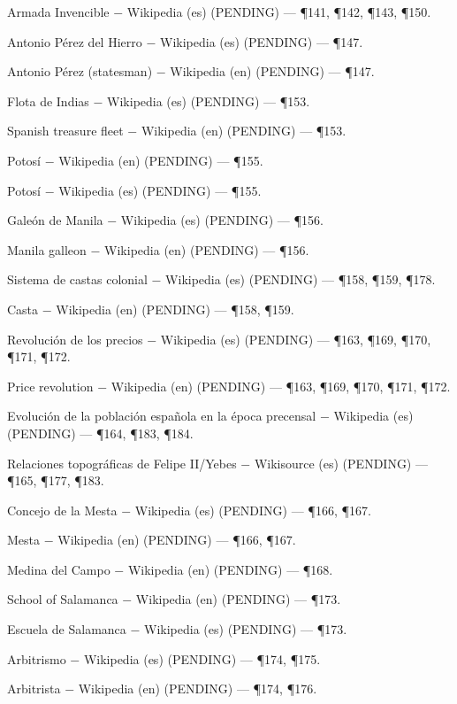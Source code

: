 \documentclass{book}
\begin{document}
\noindent Armada Invencible \(-\) Wikipedia (es) (PENDING) --- \P141, \P142, \P143, \P150.

\noindent Antonio Pérez del Hierro \(-\) Wikipedia (es) (PENDING) --- \P147.

\noindent Antonio Pérez (statesman) \(-\) Wikipedia (en) (PENDING) --- \P147.

\noindent Flota de Indias \(-\) Wikipedia (es) (PENDING) --- \P153.

\noindent Spanish treasure fleet \(-\) Wikipedia (en) (PENDING) --- \P153.

\noindent Potosí \(-\) Wikipedia (en) (PENDING) --- \P155.

\noindent Potosí \(-\) Wikipedia (es) (PENDING) --- \P155.

\noindent Galeón de Manila \(-\) Wikipedia (es) (PENDING) --- \P156.

\noindent Manila galleon \(-\) Wikipedia (en) (PENDING) --- \P156.

\noindent Sistema de castas colonial \(-\) Wikipedia (es) (PENDING) --- \P158, \P159, \P178.

\noindent Casta \(-\) Wikipedia (en) (PENDING) --- \P158, \P159.

\noindent Revolución de los precios \(-\) Wikipedia (es) (PENDING) --- \P163, \P169, \P170, \P171, \P172.

\noindent Price revolution \(-\) Wikipedia (en) (PENDING) --- \P163, \P169, \P170, \P171, \P172.

\noindent Evolución de la población española en la época precensal \(-\) Wikipedia (es) (PENDING) --- \P164, \P183, \P184.

\noindent Relaciones topográficas de Felipe II/Yebes \(-\) Wikisource (es) (PENDING) --- \P165, \P177, \P183.

\noindent Concejo de la Mesta \(-\) Wikipedia (es) (PENDING) --- \P166, \P167.

\noindent Mesta \(-\) Wikipedia (en) (PENDING) --- \P166, \P167.

\noindent Medina del Campo \(-\) Wikipedia (en) (PENDING) --- \P168.

\noindent School of Salamanca \(-\) Wikipedia (en) (PENDING) --- \P173.

\noindent Escuela de Salamanca \(-\) Wikipedia (es) (PENDING) --- \P173.

\noindent Arbitrismo \(-\) Wikipedia (es) (PENDING) --- \P174, \P175.

\noindent Arbitrista \(-\) Wikipedia (en) (PENDING) --- \P174, \P176.
\end{document}

